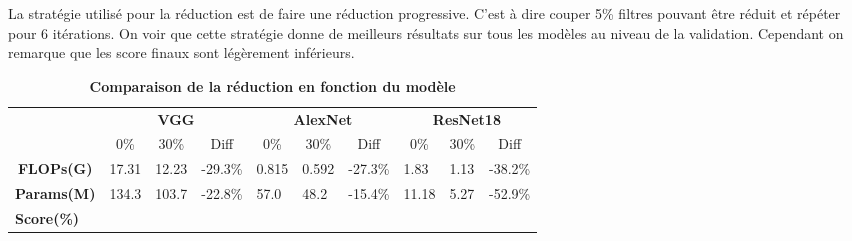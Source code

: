 \documentclass[12pt]{article}
\begin{document}
La stratégie utilisé pour la réduction est de faire une réduction progressive. C'est à dire couper 5\% filtres pouvant être réduit et répéter pour 6 itérations. On voir que cette stratégie donne de meilleurs résultats sur tous les modèles au niveau de la validation. Cependant on remarque que les score finaux sont légèrement inférieurs.
\begin{table}[H]
	\caption {\textbf{Comparaison de la réduction en fonction du modèle}}
\begin{tabular}{cccccccccc}
	\multicolumn{1}{l}{\textbf{}}           & \multicolumn{3}{c}{\textbf{VGG}}                                                                            & \multicolumn{3}{c}{\textbf{AlexNet}}                                                                        & \multicolumn{3}{c}{\textbf{ResNet18}}                                                                     \\
	\multicolumn{1}{l}{}                    & 0\%                       & 30\%                      & Diff                                                & 0\%                       & 30\%                      & Diff                                                & 0\%                       & 30\%                     & Diff                                               \\ \cline{2-10} 
	\multicolumn{1}{c|}{\textbf{FLOPs(G)}}  & \multicolumn{1}{l}{17.31} & \multicolumn{1}{l}{12.23} & \multicolumn{1}{l|}{{\color[HTML]{009901} -29.3\%}} & \multicolumn{1}{l}{0.815} & \multicolumn{1}{l}{0.592} & \multicolumn{1}{l|}{{\color[HTML]{009901} -27.3\%}} & \multicolumn{1}{l}{1.83}  & \multicolumn{1}{l}{1.13} & \multicolumn{1}{l}{{\color[HTML]{009901} -38.2\%}} \\
	\multicolumn{1}{c|}{\textbf{Params(M)}} & \multicolumn{1}{l}{134.3} & \multicolumn{1}{l}{103.7} & \multicolumn{1}{l|}{{\color[HTML]{009901} -22.8\%}} & \multicolumn{1}{l}{57.0}  & \multicolumn{1}{l}{48.2}  & \multicolumn{1}{l|}{{\color[HTML]{009901} -15.4\%}} & \multicolumn{1}{l}{11.18} & \multicolumn{1}{l}{5.27} & \multicolumn{1}{l}{{\color[HTML]{009901} -52.9\%}} \\
	\multicolumn{1}{l|}{\textbf{Score(\%)}} & \multicolumn{3}{l|}{}                                                                                       & \multicolumn{3}{l|}{}                                                                                       & \multicolumn{3}{l|}{}                                                                                     \\ \hline

\end{tabular}
\end{table}
\end{document}
